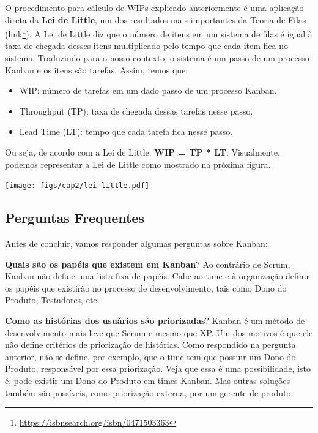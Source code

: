 \documentclass[
  11pt,
  twoside]{book}
\DeclareRobustCommand{\href}[2]{#2\footnote{\url{#1}}}
\let\origfigure\figure
\let\endorigfigure\endfigure
\renewenvironment{figure}[1][2] {
    \expandafter\origfigure\expandafter[!h]
} {
    \endorigfigure
}
\begin{document}
O procedimento para cálculo de WIPs explicado anteriormente é uma
aplicação direta da \textbf{Lei de Little}, um dos resultados mais
importantes da Teoria de Filas
(\href{https://isbnsearch.org/isbn/0471503363}{link}). A Lei de Little
diz que o número de itens em um sistema de filas é igual à taxa de
chegada desses itens multiplicado pelo tempo que cada item fica no
sistema. Traduzindo para o nosso contexto, o sistema é um passo de um
processo Kanban e os itens são tarefas. Assim, temos que:

\begin{itemize}
\item
  WIP: número de tarefas em um dado passo de um processo Kanban.
\item
  Throughput (TP):  taxa de chegada dessas tarefas
  nesse passo.
\item
  Lead Time (LT):  tempo que cada tarefa fica nesse
  passo.
\end{itemize}

Ou seja, de acordo com a Lei de Little: \textbf{WIP = TP * LT}.
Visualmente, podemos representar a Lei de Little como mostrado na
próxima figura.

\begin{figure}
\centering
\texttt{[image: figs/cap2/lei-little.pdf]}
\caption{Lei de Little: WIP = TP * LT}
\end{figure}

\hypertarget{perguntas-frequentes-2}{%
\subsection{Perguntas Frequentes}\label{perguntas-frequentes-2}}

Antes de concluir, vamos responder algumas perguntas sobre Kanban:

\textbf{Quais são os papéis que existem em Kanban}? Ao contrário de
Scrum, Kanban não define uma lista fixa de papéis. Cabe ao time e à
organização definir os papéis que existirão no processo de
desenvolvimento, tais como Dono do Produto, Testadores, etc.

\textbf{Como as histórias dos usuários são priorizadas}? Kanban é um
método de desenvolvimento mais leve que Scrum e mesmo que XP. Um dos
motivos é que ele não define critérios de priorização de histórias. Como
respondido na pergunta anterior, não se define, por exemplo, que o time
tem que possuir um Dono do Produto, responsável por essa priorização.
Veja que essa é uma possibilidade, isto é, pode existir um Dono do
Produto em times Kanban. Mas outras soluções também são possíveis, como
priorização externa, por um gerente de produto.
\end{document}
